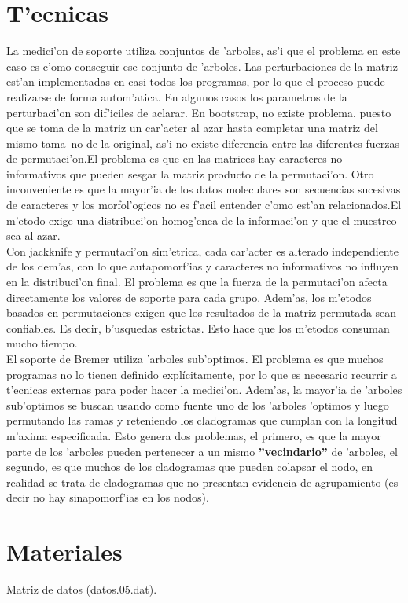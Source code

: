 \section*{T'ecnicas}
La medici'on de soporte utiliza conjuntos de 'arboles, as'i que el problema en este caso es c'omo conseguir ese conjunto de 'arboles. Las perturbaciones de la matriz est'an implementadas en casi todos los programas, por lo que el proceso puede realizarse de forma autom'atica. En algunos casos los parametros de la perturbaci'on son dif'iciles de aclarar. En bootstrap, no existe problema, puesto que se toma de la matriz un car'acter al azar hasta completar una matriz del mismo tama~no de la original, as'i no existe diferencia entre las diferentes fuerzas de permutaci'on.El problema es que en las matrices hay caracteres no informativos que pueden sesgar la matriz producto de la permutaci'on. Otro inconveniente es que la mayor'ia de los datos moleculares son secuencias sucesivas de caracteres y los morfol'ogicos no es f'acil entender c'omo est'an relacionados.El m'etodo exige una distribuci'on homog'enea de la informaci'on y que el muestreo sea al azar.\\
Con jackknife y permutaci'on sim'etrica, cada car'acter es alterado independiente de los dem'as, con lo que autapomorf'ias y caracteres no informativos no influyen en la distribuci'on final. El problema es que la fuerza de la permutaci'on afecta directamente los valores de soporte para cada grupo. Adem'as, los m'etodos basados en permutaciones exigen que los resultados de la matriz permutada sean confiables. Es decir, b'usquedas estrictas. Esto hace que los m'etodos consuman mucho tiempo.\\
El soporte de Bremer utiliza 'arboles sub'optimos. El problema es que muchos programas no lo tienen definido expl\'icitamente, por lo que es necesario recurrir a t'ecnicas externas para poder hacer la medici'on. Adem'as, la mayor'ia de 'arboles sub'optimos se buscan usando como fuente uno de los 'arboles 'optimos y luego permutando las ramas y reteniendo los cladogramas que cumplan con la longitud m'axima especificada. Esto genera dos problemas, el primero, es que la mayor parte de los 'arboles pueden pertenecer a un mismo \textbf{''vecindario''} de 'arboles, el segundo, es que muchos de los cladogramas que pueden colapsar el nodo, en realidad se trata de cladogramas que no presentan evidencia de agrupamiento (es decir no hay sinapomorf'ias en los nodos).
\section{Materiales}
Matriz de datos (datos.05.dat).
